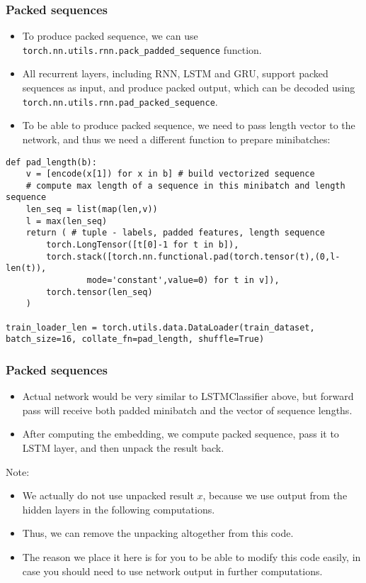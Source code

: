 \begin{frame}[fragile] \frametitle{Packed sequences}

\begin{itemize}
\item  To produce packed sequence, we can use \lstinline|torch.nn.utils.rnn.pack_padded_sequence| function. 
\item All recurrent layers, including RNN, LSTM and GRU, support packed sequences as input, and produce packed output, which can be decoded using \lstinline|torch.nn.utils.rnn.pad_packed_sequence|.
\item To be able to produce packed sequence, we need to pass length vector to the network, and thus we need a different function to prepare minibatches:
\end{itemize}

\begin{lstlisting}
def pad_length(b):
    v = [encode(x[1]) for x in b] # build vectorized sequence
    # compute max length of a sequence in this minibatch and length sequence
    len_seq = list(map(len,v))
    l = max(len_seq)
    return ( # tuple - labels, padded features, length sequence
        torch.LongTensor([t[0]-1 for t in b]),
        torch.stack([torch.nn.functional.pad(torch.tensor(t),(0,l-len(t)),
				mode='constant',value=0) for t in v]),
        torch.tensor(len_seq)
    )

train_loader_len = torch.utils.data.DataLoader(train_dataset, batch_size=16, collate_fn=pad_length, shuffle=True)
\end{lstlisting}

\end{frame}

\begin{frame}[fragile] \frametitle{Packed sequences}

\begin{itemize}
\item  Actual network would be very similar to LSTMClassifier above, but forward pass will receive both padded minibatch and the vector of sequence lengths. 
\item After computing the embedding, we compute packed sequence, pass it to LSTM layer, and then unpack the result back.
\end{itemize}

Note:
\begin{itemize}
\item   We actually do not use unpacked result $x$, because we use output from the hidden layers in the following computations. 
\item Thus, we can remove the unpacking altogether from this code. 
\item The reason we place it here is for you to be able to modify this code easily, in case you should need to use network output in further computations.
\end{itemize}

\end{frame}

